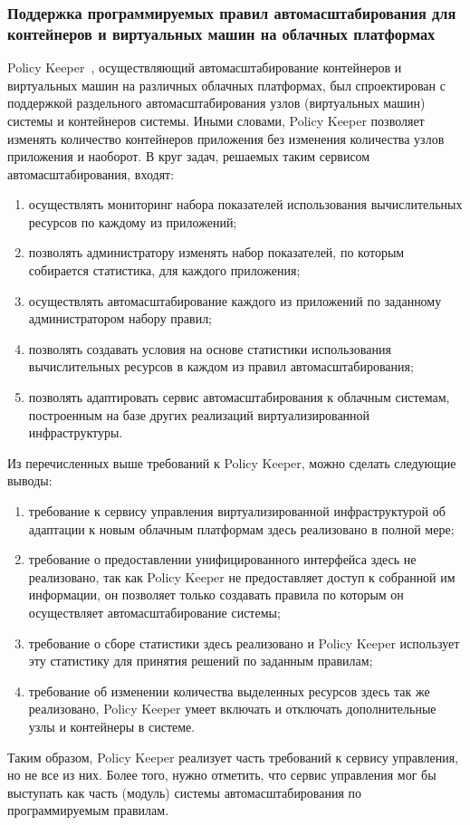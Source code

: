 \subsubsection*{Поддержка программируемых правил автомасштабирования для контейнеров и виртуальных машин на облачных платформах}
Policy Keeper~\cite{supporting-programmable-autoscaling}, осуществляющий автомасштабирование контейнеров и виртуальных машин на различных облачных платформах, был спроектирован с поддержкой раздельного автомасштабирования узлов (виртуальных машин) системы и контейнеров системы.
Иными словами, Policy Keeper позволяет изменять количество контейнеров приложения без изменения количества узлов приложения и наоборот.
В круг задач, решаемых таким сервисом автомасштабирования, входят:
\begin{enumerate}
    \item осуществлять мониторинг набора показателей использования вычислительных ресурсов по каждому из приложений;
    \item позволять администратору изменять набор показателей, по которым собирается статистика, для каждого приложения;
    \item осуществлять автомасштабирование каждого из приложений по заданному администратором набору правил;
    \item позволять создавать условия на основе статистики использования вычислительных ресурсов в каждом из правил автомасштабирования;
    \item позволять адаптировать сервис автомасштабирования к облачным системам, построенным на базе других реализаций виртуализированной инфраструктуры.
\end{enumerate}

Из перечисленных выше требований к Policy Keeper, можно сделать следующие выводы:
\begin{enumerate}
    \item требование к сервису управления виртуализированной инфраструктурой об адаптации к новым облачным платформам здесь реализовано в полной мере;
    \item требование о предоставлении унифицированного интерфейса здесь не реализовано, так как Policy Keeper не предоставляет доступ к собранной им информации, он позволяет только создавать правила по которым он осуществляет автомасштабирование системы;
    \item требование о сборе статистики здесь реализовано и Policy Keeper использует эту статистику для принятия решений по заданным правилам;
    \item требование об изменении количества выделенных ресурсов здесь так же реализовано, Policy Keeper умеет включать и отключать дополнительные узлы и контейнеры в системе.
\end{enumerate}

Таким образом, Policy Keeper реализует часть требований к сервису управления, но не все из них. Более того, нужно отметить, что сервис управления мог бы выступать как часть (модуль) системы автомасштабирования по программируемым правилам.

